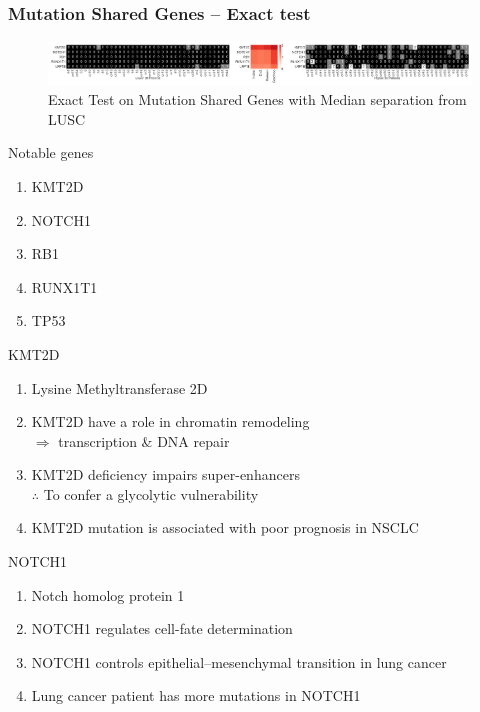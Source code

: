 \documentclass{beamer}
\begin{document}
    \begin{frame}[allowframebreaks]
        \frametitle{Mutation Shared Genes -- Exact test}

        \begin{figure}
            \includegraphics[width=\linewidth]{figures/Mutation_Shared_Proportion/Exact/BWA-SQC.Median.pdf}
            \caption{Exact Test on Mutation Shared Genes with Median separation from LUSC}
        \end{figure}

        \begin{block}{Notable genes}
            \begin{enumerate}
                \item KMT2D
                \item NOTCH1
                \item RB1
                \item RUNX1T1
                \item TP53
            \end{enumerate}
        \end{block}

        \begin{block}{KMT2D}
            \begin{enumerate}
                \item Lysine Methyltransferase 2D
                \item KMT2D have a role in chromatin remodeling \\
                    $\Rightarrow$ transcription \& DNA repair \cite{KMT2D-3, KMT2D-4}
                \item KMT2D deficiency impairs super-enhancers \\
                    $\therefore$ To confer a glycolytic vulnerability \cite{KMT2D-1}
                \item KMT2D mutation is associated with poor prognosis in NSCLC \cite{KMT2D-2}
            \end{enumerate}
        \end{block}

        \begin{block}{NOTCH1}
            \begin{enumerate}
                \item Notch homolog protein 1
                \item NOTCH1 regulates cell-fate determination \cite{NOTCH1-1, NOTCH1-2}
                \item NOTCH1 controls epithelial--mesenchymal transition in lung cancer \cite{NOTCH1-3}
                \item Lung cancer patient has more mutations in NOTCH1 \cite{NOTCH1-4}
            \end{enumerate}
        \end{block}


\end{frame}
\end{document}
